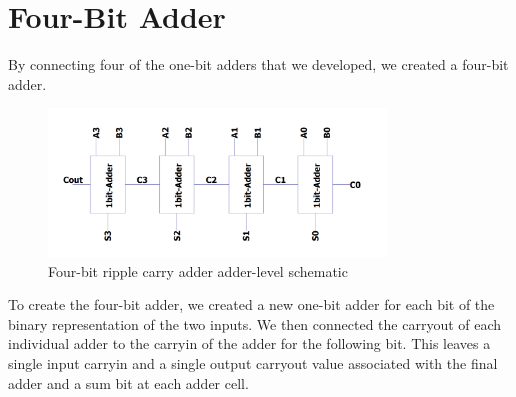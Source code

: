 \documentclass{article}
\begin{document}
\section{Four-Bit Adder}
By connecting four of the one-bit adders that we developed, we created a four-bit adder. 
\begin{figure}[H]
  \begin{center}      
  \includegraphics[width=0.8\textwidth]{images/fourbit.jpg}
  \caption{Four-bit ripple carry adder adder-level schematic}   
  \label{fig:adder_schematic}
  \end{center}
\end{figure}

To create the four-bit adder, we created a new one-bit adder for each bit of the binary representation of the two inputs. We then connected the carryout of each individual adder to the carryin of the adder for the following bit. This leaves a single input carryin and a single output carryout value associated with the final adder and a sum bit at each adder cell.
\end{document}
